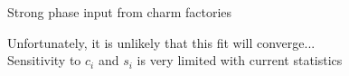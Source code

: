 \documentclass{beamer}
\begin{document}
\begin{frame}{Strong phase input from charm factories}
  \begin{center}
    \Large Unfortunately, it is unlikely that this fit will converge... \\
    \large Sensitivity to $c_i$ and $s_i$ is very limited with current statistics
  \end{center}
  \begin{center}
    \phantom{Instead, we can join forces with BESIII}
  \end{center}
  \begin{figure}
    \begin{subfigure}{0.5\textwidth}
    \end{subfigure}%
    \begin{subfigure}{0.5\textwidth}
    \end{subfigure}
  \end{figure}
  \vspace{0.3cm}
  \begin{center}
    \phantom{\large This has never been done for $D^0\to K^+K^-\pi^+\pi^-$}\\
    \phantom{\large More on this later!}
  \end{center}
\end{frame}
\end{document}
